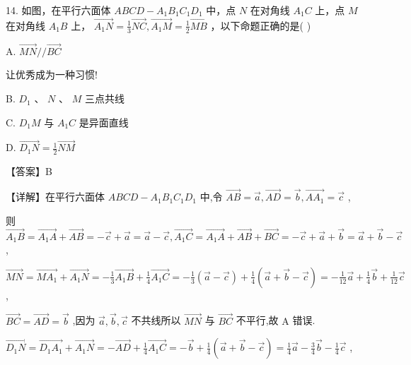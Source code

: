 \documentclass[10pt]{article}
\begin{document}
14. 如图，在平行六面体 \({ABCD} - {A}_{1}{B}_{1}{C}_{1}{D}_{1}\) 中，点 \(N\) 在对角线 \({A}_{1}C\) 上，点 \(M\) 在对角线 \({A}_{1}B\) 上， \(\overrightarrow{{A}_{1}N} = \frac{1}{3}\overrightarrow{NC},\overrightarrow{{A}_{1}M} = \frac{1}{2}\overrightarrow{MB}\) ，以下命题正确的是( )

A. \(\overrightarrow{MN}//\overrightarrow{BC}\)

让优秀成为一种习惯!

B. \({D}_{1}\text{ 、 }N\text{ 、 }M\) 三点共线

C. \({D}_{1}M\) 与 \({A}_{1}C\) 是异面直线

D. \(\overrightarrow{{D}_{1}N} = \frac{1}{2}\overrightarrow{NM}\)

【答案】B

【详解】在平行六面体 \({ABCD} - {A}_{1}{B}_{1}{C}_{1}{D}_{1}\) 中,令 \(\overrightarrow{AB} = \overrightarrow{a},\overrightarrow{AD} = \overrightarrow{b},\overrightarrow{A{A}_{1}} = \overrightarrow{c}\) ,

则 \(\overrightarrow{{A}_{1}B} = \overrightarrow{{A}_{1}A} + \overrightarrow{AB} =  - \overrightarrow{c} + \overrightarrow{a} = \overrightarrow{a} - \overrightarrow{c},\overrightarrow{{A}_{1}C} = \overrightarrow{{A}_{1}A} + \overrightarrow{AB} + \overrightarrow{BC} =  - \overrightarrow{c} + \overrightarrow{a} + \overrightarrow{b} = \overrightarrow{a} + \overrightarrow{b} - \overrightarrow{c}\) ,

\(\overrightarrow{MN} = \overrightarrow{M{A}_{1}} + \overrightarrow{{A}_{1}N} =  - \frac{1}{3}\overrightarrow{{A}_{1}B} + \frac{1}{4}\overrightarrow{{A}_{1}C} =  - \frac{1}{3}\left( {\overrightarrow{a} - \overrightarrow{c}}\right)  + \frac{1}{4}\left( {\overrightarrow{a} + \overrightarrow{b} - \overrightarrow{c}}\right)  =  - \frac{1}{12}\overrightarrow{a} + \frac{1}{4}\overrightarrow{b} + \frac{1}{12}\overrightarrow{c}\) ,

\(\overrightarrow{BC} = \overrightarrow{AD} = \overrightarrow{b}\) ,因为 \(\overrightarrow{a},\overrightarrow{b},\overrightarrow{c}\) 不共线所以 \(\overrightarrow{MN}\) 与 \(\overrightarrow{BC}\) 不平行,故 \(\mathrm{A}\) 错误.

\(\overrightarrow{{D}_{1}N} = \overrightarrow{{D}_{1}{A}_{1}} + \overrightarrow{{A}_{1}N} =  - \overrightarrow{AD} + \frac{1}{4}\overrightarrow{{A}_{1}C} =  - \overrightarrow{b} + \frac{1}{4}\left( {\overrightarrow{a} + \overrightarrow{b} - \overrightarrow{c}}\right)  = \frac{1}{4}\overrightarrow{a} - \frac{3}{4}\overrightarrow{b} - \frac{1}{4}\overrightarrow{c}\) ,
\end{document}
